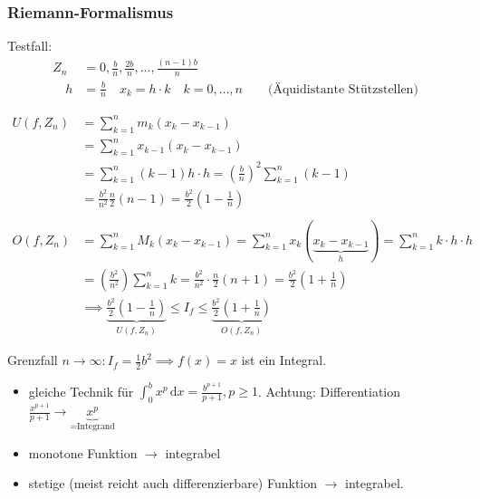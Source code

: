 \begin{center}
\end{center}


\subsubsection*{Riemann-Formalismus}
Testfall:
\begin{align*}
	Z_n &= {0,\frac{b}{n},\frac{2b}{n},\ldots,\frac{(n-1)b}{n}} \\
	\quad h &= \frac{b}{n} \quad x_k=h \cdot k \quad k=0,\ldots,n \qquad \text{(Äquidistante Stützstellen)} 
\end{align*}

\begin{align*}
	U(f,Z_n) 
	&= \sum_{k=1}^n m_k(x_k-x_{k-1}) \\
	&= \sum_{k=1}^n x_{k-1}(x_k-x_{k-1}) \\
	&= \sum_{k=1}^n (k-1)h \cdot h = \left( \frac{b}{n} \right)^2 \sum_{k=1}^n (k-1) \\
	&= \frac{b^2}{n^2} \frac{n}{2}(n-1) = \frac{b^2}{2}(1-\frac{1}{n}) \\
	\\
	O(f,Z_n)
	&=\sum_{k=1}^n M_k(x_k-x_{k-1}) = \sum_{k=1}^n x_k(\underbrace{x_k-x_{k-1}}_{h}) = \sum_{k=1}^n k \cdot h \cdot h \\
	&= \left(\frac{b^2}{n^2}\right)\sum_{k=1}^n k = \frac{b^2}{n^2} \cdot \frac{n}{2}(n+1) = \frac{b^2}{2}(1+\frac{1}{n}) \\
	&\implies \underbrace{ \frac{b^2}{2}(1-\frac{1}{n}) }_{U(f,Z_n)}\leq I_f \leq \underbrace{\frac{b^2}{2}(1+\frac{1}{n})}_{O(f,Z_n)}
\end{align*}

Grenzfall \( n \rightarrow \infty : I_f = \frac{1}{2}b^2 \implies f(x) = x \) ist ein Integral.

\begin{note}
	\begin{itemize}
		\item gleiche Technik für \( \int_0^b x^p\,\mathrm{d}x= \frac{b^{p+1}}{p+1}, p \geq 1 \).
		\newline Achtung: Differentiation \( \frac{x^{p+1}}{p+1} \rightarrow \underbrace{x^p}_{=\text{Integrand}} \)
		\item monotone Funktion \( \rightarrow \) integrabel
		\item stetige (meist reicht auch differenzierbare) Funktion \( \rightarrow \) integrabel.
	\end{itemize}	
\end{note} 

